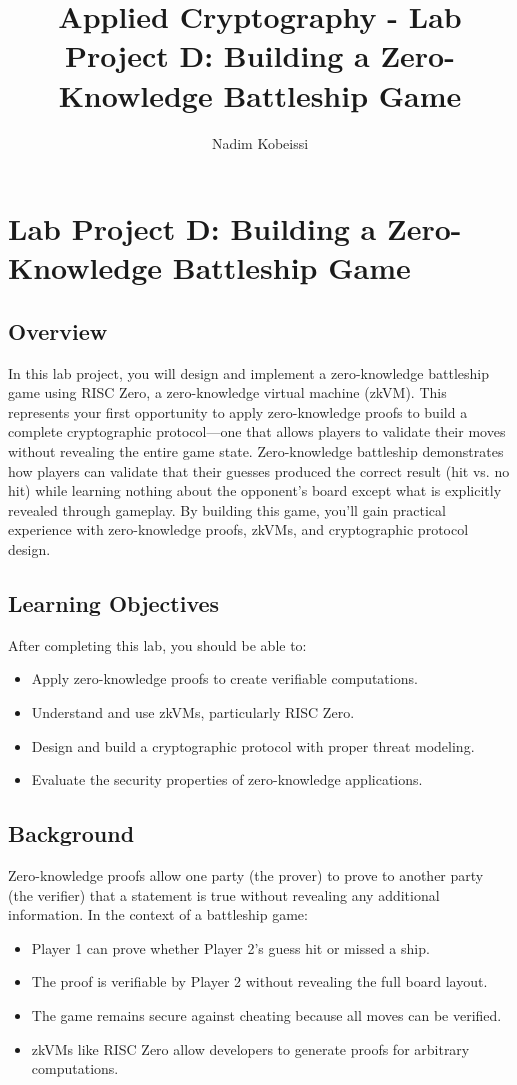 \documentclass[10pt,a4paper,american]{article}
\title{Applied Cryptography - Lab Project D: Building a Zero-Knowledge Battleship Game}
\author{Nadim Kobeissi}
\begin{document}
\classhandoutheader
\section*{Lab Project D: Building a Zero-Knowledge Battleship Game}

\subsection*{Overview}
In this lab project, you will design and implement a zero-knowledge battleship game using RISC Zero, a zero-knowledge virtual machine (zkVM). This represents your first opportunity to apply zero-knowledge proofs to build a complete cryptographic protocol—one that allows players to validate their moves without revealing the entire game state. Zero-knowledge battleship demonstrates how players can validate that their guesses produced the correct result (hit vs. no hit) while learning nothing about the opponent's board except what is explicitly revealed through gameplay. By building this game, you'll gain practical experience with zero-knowledge proofs, zkVMs, and cryptographic protocol design.

\subsection*{Learning Objectives}
After completing this lab, you should be able to:
\begin{itemize}
	\item Apply zero-knowledge proofs to create verifiable computations.
	\item Understand and use zkVMs, particularly RISC Zero.
	\item Design and build a cryptographic protocol with proper threat modeling.
	\item Evaluate the security properties of zero-knowledge applications.
\end{itemize}

\subsection*{Background}
Zero-knowledge proofs allow one party (the prover) to prove to another party (the verifier) that a statement is true without revealing any additional information. In the context of a battleship game:
\begin{itemize}
	\item Player 1 can prove whether Player 2's guess hit or missed a ship.
	\item The proof is verifiable by Player 2 without revealing the full board layout.
	\item The game remains secure against cheating because all moves can be verified.
	\item zkVMs like RISC Zero allow developers to generate proofs for arbitrary computations.
\end{itemize}
\end{document}
